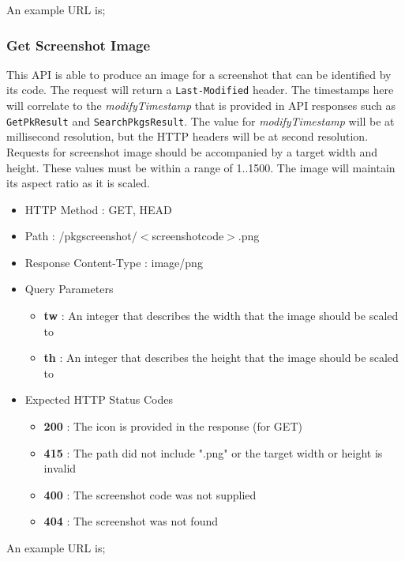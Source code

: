 An example URL is;


\subsubsection{Get Screenshot Image}

This API is able to produce an image for a screenshot that can be identified by its code.  The request will return a {\tt Last-Modified} header.  The timestamps here will correlate to the {\it modifyTimestamp} that is provided in API responses such as {\tt GetPkResult} and {\tt SearchPkgsResult}.  The value for {\it modifyTimestamp} will be at millisecond resolution, but the HTTP headers will be at second resolution.  Requests for screenshot image should be accompanied by a target width and height.  These values must be within a range of 1..1500.  The image will maintain its aspect ratio as it is scaled.

\begin{itemize}
\item HTTP Method : GET, HEAD
\item Path : /pkgscreenshot/$<$screenshotcode$>$.png
\item Response Content-Type : image/png
\item Query Parameters
  \begin{itemize}
  \item {\bf tw} : An integer that describes the width that the image should be scaled to
  \item {\bf th} : An integer that describes the height that the image should be scaled to
  \end{itemize}
\item Expected HTTP Status Codes
  \begin{itemize}
  \item {\bf 200} : The icon is provided in the response (for GET)
  \item {\bf 415} : The path did not include ".png" or the target width or height is invalid
  \item {\bf 400} : The screenshot code was not supplied
  \item {\bf 404} : The screenshot was not found
  \end{itemize}
\end{itemize}

An example URL is;


